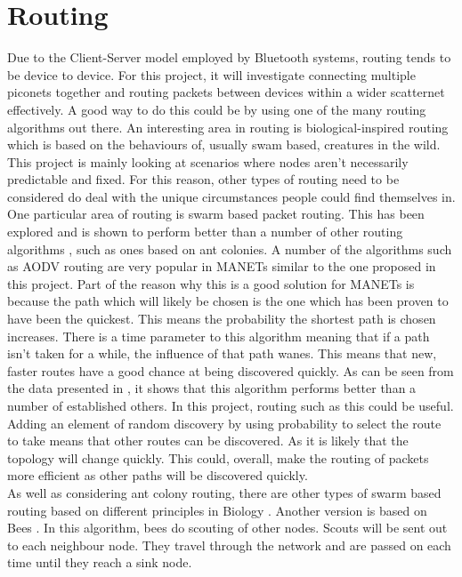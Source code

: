 \documentclass{report}
\begin{document}
\section*{Routing}

Due to the Client-Server model employed by Bluetooth systems, routing tends to be device to device. For this project, it will investigate connecting multiple piconets together 
and routing packets between devices within a wider scatternet effectively. A good way to do this could be by using one of the many routing algorithms out there. An interesting 
area in routing is biological-inspired routing which is based on the behaviours of, usually swam based, creatures in the wild. This project is mainly looking at scenarios where 
nodes aren't necessarily predictable and fixed. For this reason, other types of routing need to be considered do deal with the unique circumstances people could find themselves in.
\bigskip\\
One particular area of routing is swarm based packet routing. This has been explored and is shown to perform better than a number of other routing algorithms \cite{lin2014performance}, such as ones based on ant colonies. 
A number of the algorithms such as AODV routing are very popular in MANETs similar to the one proposed in this project. Part of the reason why this is a good solution for MANETs is 
because the path which will likely be chosen is the one which has been proven to have been the quickest. This means the probability the shortest path is chosen increases. There is a time parameter to 
this algorithm meaning that if a path isn't taken for a while, the influence of that path wanes. This means that new, faster routes have a good chance at being discovered quickly.
As can be seen from the data presented in \cite{lin2014performance}, it shows that this algorithm performs better than a number of established others. In this project, routing such 
as this could be useful. Adding an element of random discovery by using probability to select the route to take means that other routes can be discovered. As it is likely that the 
topology will change quickly. This could, overall, make the routing of packets more efficient as other paths will be discovered quickly. 
\bigskip\\
As well as considering ant colony routing, there are other types of swarm based routing based on different principles in Biology \cite{sharvani2009different}. Another version is based on Bees \cite{leonov2016modeling}. 
In this algorithm, bees do scouting of other nodes. Scouts will be sent out to each neighbour node. They travel through the network and are passed on each time until they reach a sink node. 
\end{document}
